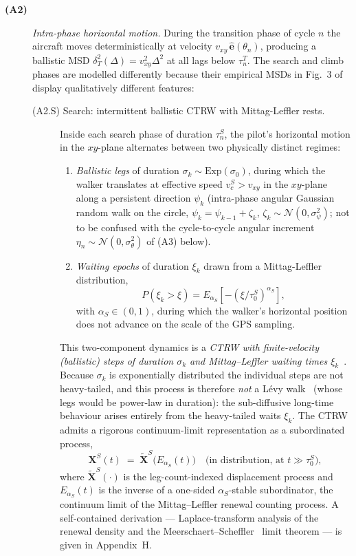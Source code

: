 \documentclass[11pt,a4paper]{article}
\begin{document}
\begin{description}
\item[\textbf{(A2)}] \emph{Intra-phase horizontal motion.} During the
transition phase of cycle $n$ the aircraft moves deterministically
at velocity $v_{xy}\,\hat{\mathbf{e}}(\theta_n)$, producing a
ballistic MSD $\delta^2_T(\Delta) = v_{xy}^2 \Delta^2$ at all lags
below $\tau^T_n$. The search and climb phases are modelled
differently because their empirical MSDs in Fig.~3
of~\cite{vilpellet2026} display qualitatively different features:
\begin{description}
\item[(A2.S) Search: intermittent ballistic CTRW with
Mittag-Leffler rests.] Inside each search phase of duration
$\tau^S_n$, the pilot's horizontal motion in the
$xy$-plane alternates between two physically distinct regimes:
\begin{enumerate}
\setlength{\itemsep}{0.5ex}
\item \emph{Ballistic legs} of duration
$\sigma_k \sim \mathrm{Exp}(\sigma_0)$, during which the walker
translates at effective speed $v_c^S > v_{xy}$ in the $xy$-plane
along a persistent direction $\psi_k$ (intra-phase angular
Gaussian random walk on the circle,
$\psi_k = \psi_{k-1} + \zeta_k$, $\zeta_k \sim \mathcal{N}(0,
\sigma_\psi^2)$; not to be confused with the cycle-to-cycle angular
increment $\eta_n\sim\mathcal{N}(0,\sigma_\theta^2)$ of (A3) below).
\item \emph{Waiting epochs} of duration
$\xi_k$ drawn from a Mittag-Leffler distribution,
\begin{equation}
P(\xi_k > \xi)
= E_{\alpha_S}\!\left[-(\xi/\tau_0^S)^{\alpha_S}\right],
\label{eq:ml-wait}
\end{equation}
with $\alpha_S \in (0, 1)$, during which the walker's horizontal
position does not advance on the scale of the GPS sampling.
\end{enumerate}
This two-component dynamics is a \emph{CTRW with finite-velocity
(ballistic) steps of duration $\sigma_k$ and Mittag--Leffler
waiting times $\xi_k$}~\cite{scalas2004,metzler2000}. Because
$\sigma_k$ is exponentially distributed the individual steps are
not heavy-tailed, and this process is therefore \emph{not} a
Lévy walk~\cite{zaburdaev2015} (whose legs would be power-law in
duration): the sub-diffusive long-time behaviour arises entirely
from the heavy-tailed waits $\xi_k$. The CTRW admits a rigorous
continuum-limit representation as a subordinated process,
\begin{equation}
\mathbf{X}^S(t) \;=\; \tilde{\mathbf{X}}^S\bigl(E_{\alpha_S}(t)\bigr)
\quad\text{(in distribution, at $t\gg\tau_0^S$)},
\label{eq:subord}
\end{equation}
where $\tilde{\mathbf{X}}^S(\cdot)$ is the leg-count-indexed
displacement process and $E_{\alpha_S}(t)$ is the inverse of a
one-sided $\alpha_S$-stable subordinator, the continuum limit of
the Mittag--Leffler renewal counting process. A self-contained
derivation --- Laplace-transform analysis of the renewal density
and the Meerschaert--Scheffler~\cite{meerschaert2004} limit
theorem --- is given in Appendix~H.


\end{description}
\end{description}
\end{document}
